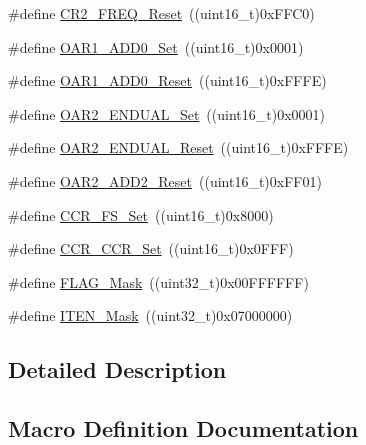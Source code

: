 \begin{DoxyCompactItemize}
\item 
\#define \hyperlink{group___i2_c___private___defines_ga2bcf74bd8fc3aaa931faf750d1afe405}{C\+R2\+\_\+\+F\+R\+E\+Q\+\_\+\+Reset}~((uint16\+\_\+t)0x\+F\+F\+C0)
\item 
\#define \hyperlink{group___i2_c___private___defines_gaeb56bf422fd13e68c82783df63f425ab}{O\+A\+R1\+\_\+\+A\+D\+D0\+\_\+\+Set}~((uint16\+\_\+t)0x0001)
\item 
\#define \hyperlink{group___i2_c___private___defines_gac5c2ac4577b70e1d7618b7fa1d715e3a}{O\+A\+R1\+\_\+\+A\+D\+D0\+\_\+\+Reset}~((uint16\+\_\+t)0x\+F\+F\+F\+E)
\item 
\#define \hyperlink{group___i2_c___private___defines_ga859551657f688e5efdb3f573e78ee979}{O\+A\+R2\+\_\+\+E\+N\+D\+U\+A\+L\+\_\+\+Set}~((uint16\+\_\+t)0x0001)
\item 
\#define \hyperlink{group___i2_c___private___defines_gaae86eb7689c73e34388cfbd03b8d9ecd}{O\+A\+R2\+\_\+\+E\+N\+D\+U\+A\+L\+\_\+\+Reset}~((uint16\+\_\+t)0x\+F\+F\+F\+E)
\item 
\#define \hyperlink{group___i2_c___private___defines_ga243036db699954e290f48e6743323054}{O\+A\+R2\+\_\+\+A\+D\+D2\+\_\+\+Reset}~((uint16\+\_\+t)0x\+F\+F01)
\item 
\#define \hyperlink{group___i2_c___private___defines_ga3af49180596b283514782708ac85606e}{C\+C\+R\+\_\+\+F\+S\+\_\+\+Set}~((uint16\+\_\+t)0x8000)
\item 
\#define \hyperlink{group___i2_c___private___defines_ga07695fd4c06df54def77840118f83a0d}{C\+C\+R\+\_\+\+C\+C\+R\+\_\+\+Set}~((uint16\+\_\+t)0x0\+F\+F\+F)
\item 
\#define \hyperlink{group___i2_c___private___defines_ga2be62bf481cd44de9ab604efe5595ff6}{F\+L\+A\+G\+\_\+\+Mask}~((uint32\+\_\+t)0x00\+F\+F\+F\+F\+F\+F)
\item 
\#define \hyperlink{group___i2_c___private___defines_gab99e12994e073c2a681a6cf68492b3e2}{I\+T\+E\+N\+\_\+\+Mask}~((uint32\+\_\+t)0x07000000)
\end{DoxyCompactItemize}


\subsection{Detailed Description}


\subsection{Macro Definition Documentation}
\mbox{\label{group___i2_c___private___defines_ga07695fd4c06df54def77840118f83a0d}} 

